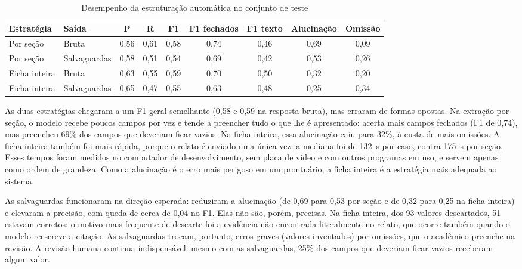 \begin{table}[htbp]
	\caption{Desempenho da estruturação automática no conjunto de teste}
	\label{tb:exp-a}
	\footnotesize
	\centering
	\setlength{\tabcolsep}{4pt}
	\begin{tabular}{llccccccc}
		\hline
		\textbf{Estratégia} & \textbf{Saída} & \textbf{P} & \textbf{R} & \textbf{F1} & \textbf{F1 fechados} & \textbf{F1 texto} & \textbf{Alucinação} & \textbf{Omissão} \\ \hline
		Por seção & Bruta & 0,56 & 0,61 & 0,58 & 0,74 & 0,46 & 0,69 & 0,09 \\
		Por seção & Salvaguardas & 0,58 & 0,51 & 0,54 & 0,69 & 0,42 & 0,53 & 0,26 \\
		Ficha inteira & Bruta & 0,63 & 0,55 & 0,59 & 0,70 & 0,50 & 0,32 & 0,20 \\
		Ficha inteira & Salvaguardas & 0,65 & 0,47 & 0,55 & 0,63 & 0,48 & 0,25 & 0,34 \\ \hline
	\end{tabular}
\end{table}

As duas estratégias chegaram a um F1 geral semelhante (0,58 e 0,59 na resposta bruta), mas erraram de formas opostas. Na extração por seção, o modelo recebe poucos campos por vez e tende a preencher tudo o que lhe é apresentado: acerta mais campos fechados (F1 de 0,74), mas preencheu 69\% dos campos que deveriam ficar vazios. Na ficha inteira, essa alucinação caiu para 32\%, à custa de mais omissões. A ficha inteira também foi mais rápida, porque o relato é enviado uma única vez: a mediana foi de 132~s por caso, contra 175~s por seção. Esses tempos foram medidos no computador de desenvolvimento, sem placa de vídeo e com outros programas em uso, e servem apenas como ordem de grandeza. Como a alucinação é o erro mais perigoso em um prontuário, a ficha inteira é a estratégia mais adequada ao sistema.

As salvaguardas funcionaram na direção esperada: reduziram a alucinação (de 0,69 para 0,53 por seção e de 0,32 para 0,25 na ficha inteira) e elevaram a precisão, com queda de cerca de 0,04 no F1. Elas não são, porém, precisas. Na ficha inteira, dos 93 valores descartados, 51 estavam corretos: o motivo mais frequente de descarte foi a evidência não encontrada literalmente no relato, que ocorre também quando o modelo reescreve a citação. As salvaguardas trocam, portanto, erros graves (valores inventados) por omissões, que o acadêmico preenche na revisão. A revisão humana continua indispensável: mesmo com as salvaguardas, 25\% dos campos que deveriam ficar vazios receberam algum valor.

